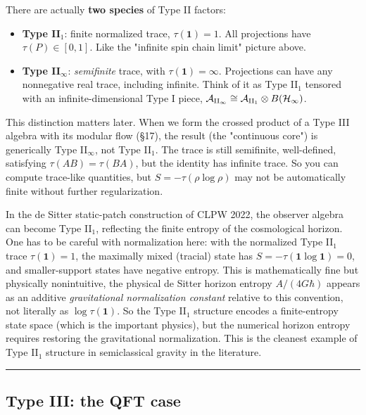 \documentclass[11pt,a4paper]{article}
\begin{document}
There are actually \textbf{two species} of Type II factors:

\begin{itemize}
  \item \textbf{Type II$_1$}: finite normalized trace, $\tau(\mathbf{1}) = 1$. All projections have $\tau(P) \in [0, 1]$. Like the "infinite spin chain limit" picture above.
  \item \textbf{Type II$_\infty$}: \emph{semifinite} trace, with $\tau(\mathbf{1}) = \infty$. Projections can have any nonnegative real trace, including infinite. Think of it as Type II$_1$ tensored with an infinite-dimensional Type I piece, $\mathcal{A}_{\rm II_\infty} \cong \mathcal{A}_{\rm II_1} \otimes B(\mathcal{H}_\infty)$.
\end{itemize}

This distinction matters later. When we form the crossed product of a Type III algebra with its modular flow (§17), the result (the "continuous core") is generically Type II$_\infty$, not Type II$_1$. The trace is still semifinite, well-defined, satisfying $\tau(AB) = \tau(BA)$, but the identity has infinite trace. So you can compute trace-like quantities, but $S = -\tau(\rho \log \rho)$ may not be automatically finite without further regularization.

In the de Sitter static-patch construction of CLPW 2022, the observer algebra can become Type II$_1$, reflecting the finite entropy of the cosmological horizon. One has to be careful with normalization here: with the normalized Type II$_1$ trace $\tau(\mathbf{1}) = 1$, the maximally mixed (tracial) state has $S = -\tau(\mathbf{1} \log \mathbf{1}) = 0$, and smaller-support states have negative entropy. This is mathematically fine but physically nonintuitive, the physical de Sitter horizon entropy $A/(4G\hbar)$ appears as an additive \emph{gravitational normalization constant} relative to this convention, not literally as $\log \tau(\mathbf{1})$. So the Type II$_1$ structure encodes a finite-entropy state space (which is the important physics), but the numerical horizon entropy requires restoring the gravitational normalization. This is the cleanest example of Type II$_1$ structure in semiclassical gravity in the literature.

\medskip\hrule\medskip

\subsection{Type III: the QFT case}
\end{document}
